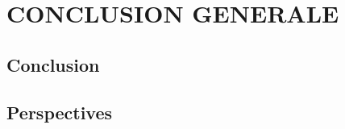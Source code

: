 \documentclass[
10pt, %
a4paper, %
oneside, %
headinclude,footinclude, %
BCOR5mm, %
]{report}
\begin{document}
										  
										  
		\newpage
		\section{CONCLUSION GENERALE}
		\subsection{Conclusion}
		\lipsum[10]
		\subsection{Perspectives}
		\lipsum[10]
										  
										  
														  
																
		\newpage
		\listoffigures %
		\newpage
		\listoftables %
										  
											
																
																
		\renewcommand{\refname}{\spacedlowsmallcaps{References}} %
		\newpage 
		
																
																
																
\end{document}
